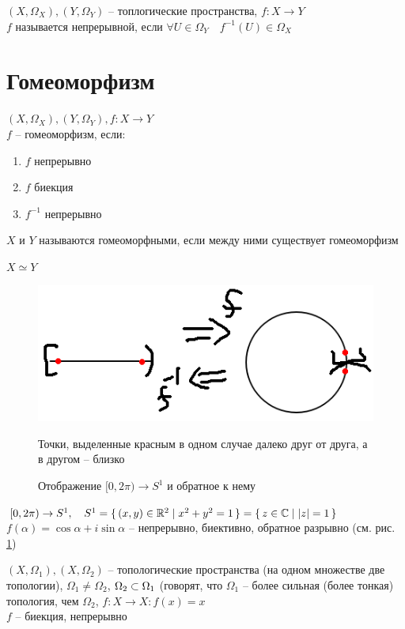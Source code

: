 \begin{definition}
	$ (X, \Omega_X), (Y, \Omega_Y) $ -- топлогические пространства, $ f : X \to Y $ \\
    $f$ называется непрерывной, если $ \forall U \in \Omega_Y \quad f^{-1}(U) \in \Omega_X $
\end{definition}

\section{Гомеоморфизм}

\begin{definition}
	$ (X, \Omega_X), (Y, \Omega_Y), f : X \to Y $ \\
    $f$ -- гомеоморфизм, если:
    \begin{enumerate}
    	\item $f$ непрерывно
        \item $f$ биекция
        \item $f^{-1}$ непрерывно
    \end{enumerate}
    $ X $ и $ Y $ называются гомеоморфными, если между ними существует гомеоморфизм
\end{definition}

\begin{notation}
	$ X \simeq Y $
\end{notation}


\begin{figure}[!ht]
	\includegraphics{1}
    \caption{Отображение $ [0, 2\pi) \to S^1 $ и обратное к нему}
    \label{fig:1}
    Точки, выделенные красным в одном случае далеко друг от друга, а в другом -- близко
\end{figure}

\begin{exmpls}
    \item $ [0, 2\pi) \to S^1, \quad S^1 = \set{(x, y) \in \ensuremath{\mathbb{R}}^2 | x^2 + y^2 = 1} = \set{z \in \ensuremath{\mathbb{C}}| |z| = 1} $ \\
    $ f(\alpha) = \cos \alpha + i \sin \alpha $ -- непрерывно, биективно, обратное разрывно (см. рис. \ref{fig:1})
    \item $ (X, \Omega_1), (X, \Omega_2) $ -- топологические пространства (на одном множестве две топологии), $\Omega_1 \ne \Omega_2 $, $ \Omega_2 \subset \Omega_1 $ (говорят, что $\Omega_1$ -- более сильная (более тонкая) топология, чем $\Omega_2$, $f : X \to X : f(x) = x $ \\
    $ f $ -- биекция, непрерывно
\end{exmpls}

